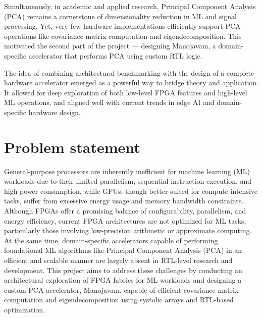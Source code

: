 Simultaneously, in academic and applied research, Principal Component Analysis (PCA) remains a cornerstone of dimensionality reduction in ML and signal processing. Yet, very few hardware implementations efficiently support PCA operations like covariance matrix computation and eigendecomposition. This motivated the second part of the project — designing Manojavam, a domain-specific accelerator that performs PCA using custom RTL logic.

The idea of combining architectural benchmarking with the design of a complete hardware accelerator emerged as a powerful way to bridge theory and application. It allowed for deep exploration of both low-level FPGA features and high-level ML operations, and aligned well with current trends in edge AI and domain-specific hardware design.

\section[Problem statement]{\textbf{Problem statement}}
General-purpose processors are inherently inefficient for machine learning (ML) workloads due to their limited parallelism, sequential instruction execution, and high power consumption, while GPUs, though better suited for compute-intensive tasks, suffer from excessive energy usage and memory bandwidth constraints. Although FPGAs offer a promising balance of configurability, parallelism, and energy efficiency, current FPGA architectures are not optimized for ML tasks, particularly those involving low-precision arithmetic or approximate computing. At the same time, domain-specific accelerators capable of performing foundational ML algorithms like Principal Component Analysis (PCA) in an efficient and scalable manner are largely absent in RTL-level research and development. This project aims to address these challenges by conducting an architectural exploration of FPGA fabrics for ML workloads and designing a custom PCA accelerator, Manojavam, capable of efficient covariance matrix computation and eigendecomposition using systolic arrays and RTL-based optimization.

